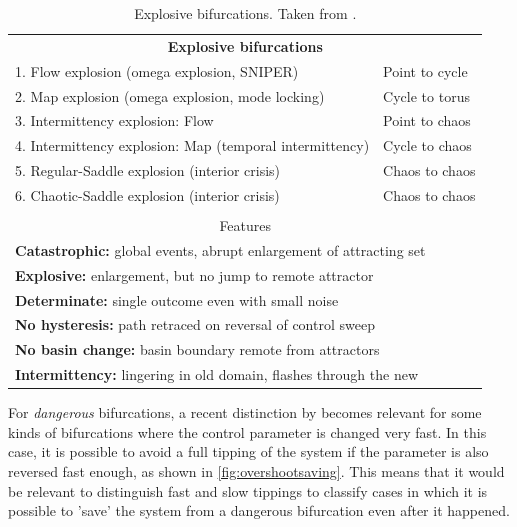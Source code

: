 \begin{table}[H]
	\centering
	\begin{tabular}{ll}
		\hline
		\multicolumn{2}{c}{\textbf{Explosive bifurcations}} \\
		
		1. Flow explosion (omega explosion, SNIPER) & Point to cycle\\
		2. Map explosion (omega explosion, mode locking) & Cycle to torus \\				
		3. Intermittency explosion: Flow & Point to chaos \\			
		4. Intermittency explosion: Map (temporal intermittency) & Cycle to chaos \\	
		5. Regular-Saddle explosion (interior crisis) & Chaos to chaos \\	
		6. Chaotic-Saddle explosion (interior crisis) & Chaos to chaos \\	
		& \\
		\multicolumn{2}{c}{Features}	\\
		\multicolumn{2}{l}{\textbf{Catastrophic:} global events, abrupt enlargement of attracting set}\\
		\multicolumn{2}{l}{	\textbf{Explosive:} enlargement, but no jump to remote attractor}	\\
		\multicolumn{2}{l}{	\textbf{Determinate:} single outcome even with small noise}	\\
		\multicolumn{2}{l}{	\textbf{No hysteresis:} path retraced on reversal of control sweep}	\\
		\multicolumn{2}{l}{	\textbf{No basin change:} basin boundary remote from attractors}\\
		\multicolumn{2}{l}{	\textbf{Intermittency:} lingering in old domain, flashes through the new}	\\   
		\hline
	\end{tabular}
	\caption{Explosive bifurcations. Taken from \cite{Thompson2011a}.}
	\label{tab:explos_bifs}
\end{table}


For \textit{dangerous} bifurcations, a recent distinction by \cite{Ritchie2021} becomes relevant for some kinds of bifurcations where the control parameter is changed very fast. In this case, it is possible to avoid a full tipping of the system if the parameter is also reversed fast enough, as shown in  \cref{fig:overshootsaving}. 
This means that it would be relevant to distinguish fast and slow tippings to classify cases in which it is possible to 'save' the system from a dangerous bifurcation even after it happened. 

